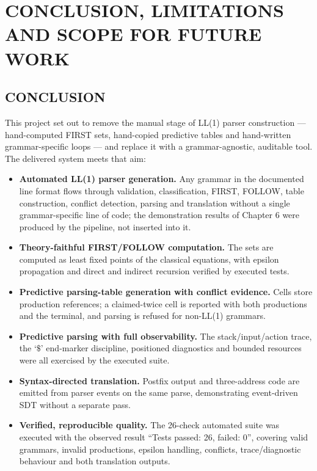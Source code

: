 \documentclass[12pt,a4paper,oneside,openany]{report}
\begin{document}



\chapter{CONCLUSION, LIMITATIONS AND SCOPE FOR FUTURE WORK}

\section{CONCLUSION}
This project set out to remove the manual stage of LL(1) parser
construction --- hand-computed FIRST sets, hand-copied predictive tables
and hand-written grammar-specific loops --- and replace it with a
grammar-agnostic, auditable tool. The delivered system meets that aim:

\begin{itemize}
  \item \textbf{Automated LL(1) parser generation.} Any grammar in the
        documented line format flows through validation, classification,
        FIRST, FOLLOW, table construction, conflict detection, parsing
        and translation without a single grammar-specific line of code;
        the demonstration results of Chapter 6 were produced by the
        pipeline, not inserted into it.
  \item \textbf{Theory-faithful FIRST/FOLLOW computation.} The sets are
        computed as least fixed points of the classical equations, with
        epsilon propagation and direct and indirect recursion verified by
        executed tests.
  \item \textbf{Predictive parsing-table generation with conflict
        evidence.} Cells store production references; a claimed-twice
        cell is reported with both productions and the terminal, and
        parsing is refused for non-LL(1) grammars.
  \item \textbf{Predictive parsing with full observability.} The
        stack/input/action trace, the `$\$$' end-marker discipline,
        positioned diagnostics and bounded resources were all exercised
        by the executed suite.
  \item \textbf{Syntax-directed translation.} Postfix output and
        three-address code are emitted from parser events on the same
        parse, demonstrating event-driven SDT without a separate pass.
  \item \textbf{Verified, reproducible quality.} The 26-check automated
        suite was executed with the observed result ``Tests passed: 26,
        failed: 0'', covering valid grammars, invalid productions,
        epsilon handling, conflicts, trace/diagnostic behaviour and both
        translation outputs.
\end{itemize}
\end{document}
